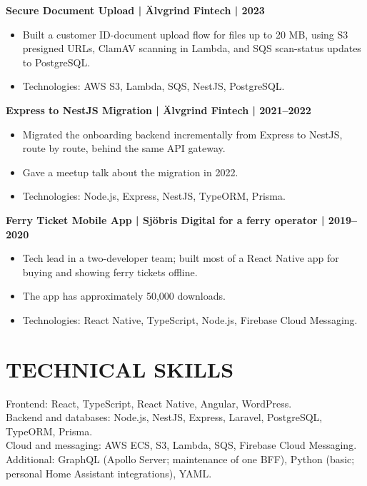 \documentclass[11pt,a4paper]{article}
\begin{document}
\textbf{Secure Document Upload | Älvgrind Fintech | 2023}
\begin{itemize}
\item Built a customer ID-document upload flow for files up to 20 MB, using S3 presigned URLs, ClamAV scanning in Lambda, and SQS scan-status updates to PostgreSQL.
\item Technologies: AWS S3, Lambda, SQS, NestJS, PostgreSQL.
\end{itemize}

\textbf{Express to NestJS Migration | Älvgrind Fintech | 2021–2022}
\begin{itemize}
\item Migrated the onboarding backend incrementally from Express to NestJS, route by route, behind the same API gateway.
\item Gave a meetup talk about the migration in 2022.
\item Technologies: Node.js, Express, NestJS, TypeORM, Prisma.
\end{itemize}

\textbf{Ferry Ticket Mobile App | Sjöbris Digital for a ferry operator | 2019–2020}
\begin{itemize}
\item Tech lead in a two-developer team; built most of a React Native app for buying and showing ferry tickets offline.
\item The app has approximately 50,000 downloads.
\item Technologies: React Native, TypeScript, Node.js, Firebase Cloud Messaging.
\end{itemize}

\section*{TECHNICAL SKILLS}
Frontend: React, TypeScript, React Native, Angular, WordPress.\\
Backend and databases: Node.js, NestJS, Express, Laravel, PostgreSQL, TypeORM, Prisma.\\
Cloud and messaging: AWS ECS, S3, Lambda, SQS, Firebase Cloud Messaging.\\
Additional: GraphQL (Apollo Server; maintenance of one BFF), Python (basic; personal Home Assistant integrations), YAML.
\end{document}
